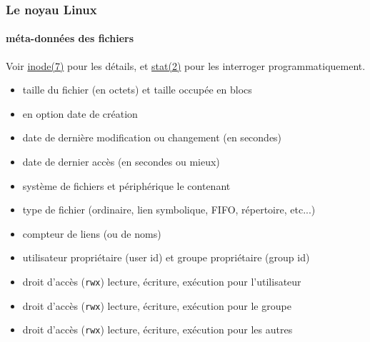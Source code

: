 \documentclass[xcolor=svgnames,final,smaller,a4]{beamer}
\begin{document}
\begin{frame}
  \frametitle{Le noyau Linux}
  \framesubtitle{méta-données des fichiers}

  Voir \href{https://man7.org/linux/man-pages/man7/inode.7.html}{inode(7)} pour les détails, et \href{https://man7.org/linux/man-pages/man2/stat.2.html}{stat(2)} pour les interroger programmatiquement.

  \begin{relsize}{-0.5}
  \begin{itemize}
  \item taille du fichier (en octets) et taille occupée en blocs
    \item en option date de création {}
    \item date de dernière modification ou changement (en secondes)
    \item date de dernier accès (en secondes ou mieux)
    \item système de fichiers et périphérique le contenant
    \item type de fichier (ordinaire, lien symbolique, FIFO, répertoire, etc...)
    \item compteur de liens (ou de noms)
    \item utilisateur propriétaire (user id) et groupe propriétaire (group id)
    \item droit d'accès (\texttt{rwx}) lecture, écriture, exécution pour l'utilisateur
    \item droit d'accès (\texttt{rwx}) lecture, écriture, exécution pour le groupe
    \item droit d'accès (\texttt{rwx}) lecture, écriture, exécution pour les autres
  \end{itemize}
  \end{relsize}
\end{frame}
\end{document}

